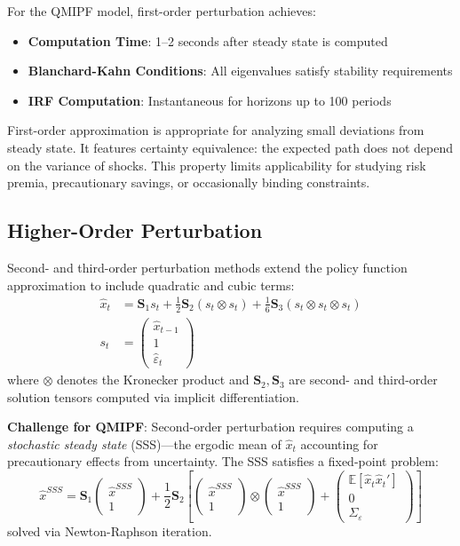 \documentclass[12pt]{article}
\begin{document}
For the QMIPF model, first-order perturbation achieves:
\begin{itemize}
\item \textbf{Computation Time}: 1--2 seconds after steady state is computed
\item \textbf{Blanchard-Kahn Conditions}: All eigenvalues satisfy stability requirements
\item \textbf{IRF Computation}: Instantaneous for horizons up to 100 periods
\end{itemize}

First-order approximation is appropriate for analyzing small deviations from steady state. It features certainty equivalence: the expected path does not depend on the variance of shocks. This property limits applicability for studying risk premia, precautionary savings, or occasionally binding constraints.

\subsection{Higher-Order Perturbation}

Second- and third-order perturbation methods extend the policy function approximation to include quadratic and cubic terms:
\begin{align}
\hat{x}_t &= \mathbf{S}_1 s_t + \frac{1}{2} \mathbf{S}_2 (s_t \otimes s_t) + \frac{1}{6} \mathbf{S}_3 (s_t \otimes s_t \otimes s_t) \\
s_t &= \begin{pmatrix} \hat{x}_{t-1} \\ 1 \\ \hat{\varepsilon}_t \end{pmatrix}
\end{align}
where $\otimes$ denotes the Kronecker product and $\mathbf{S}_2, \mathbf{S}_3$ are second- and third-order solution tensors computed via implicit differentiation.

\textbf{Challenge for QMIPF}: Second-order perturbation requires computing a \emph{stochastic steady state} (SSS)---the ergodic mean of $\hat{x}_t$ accounting for precautionary effects from uncertainty. The SSS satisfies a fixed-point problem:
\begin{equation}
\hat{x}^{SSS} = \mathbf{S}_1 \begin{pmatrix} \hat{x}^{SSS} \\ 1 \end{pmatrix} + \frac{1}{2} \mathbf{S}_2 \left[ \begin{pmatrix} \hat{x}^{SSS} \\ 1 \end{pmatrix} \otimes \begin{pmatrix} \hat{x}^{SSS} \\ 1 \end{pmatrix} + \begin{pmatrix} \mathbb{E}[\hat{x}_t \hat{x}_t'] \\ 0 \\ \Sigma_\varepsilon \end{pmatrix} \right]
\end{equation}
solved via Newton-Raphson iteration.
\end{document}
